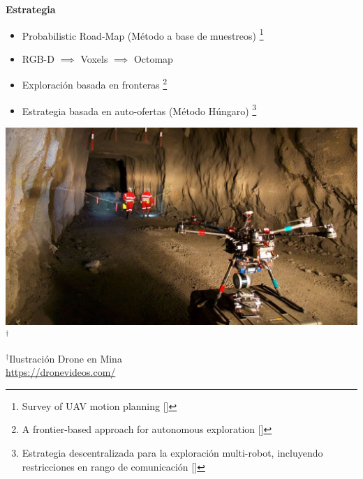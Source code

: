 \documentclass[
  24pt, %
  aspectratio=169, %
]{beamer}
\begin{document}
\begin{frame}
  
  \begin{minipage}{0.47\textwidth}
    \textbf{Estrategia}
    \begin{itemize}
    \item \small Probabilistic Road-Map (Método a base de muestreos) \footnote{Survey of UAV motion planning [\cite{Quan2020}]}  
    \item \small RGB-D $\implies$ Voxels $\implies$ Octomap
      
    \item \small Exploración basada en fronteras \footnote{A frontier-based approach for autonomous exploration [\cite{613851}]}
    \item \small Estrategia basada en auto-ofertas (Método Húngaro) \footnote{Estrategia descentralizada para la exploración multi-robot, incluyendo restricciones en rango de comunicación [\cite{LEAL2013}]}
      
    \end{itemize}
  \end{minipage}
  \hspace{0.1cm}
  \begin{minipage}{0.5\textwidth}
    \includegraphics[width=\textwidth]{maxresdefault.jpg}$^\dag$\\
    \rule{0in}{1.2em}$^\dag$\scriptsize Ilustración Drone en Mina \\
    \tiny \url{https://dronevideos.com/} 
  \end{minipage}
  
\end{frame}
\end{document}
